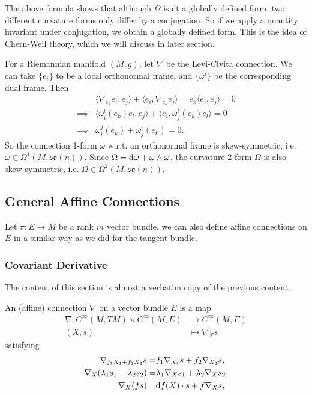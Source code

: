 The above formula shows that although $\Omega$ isn't a globally defined form, two different curvature forms 
only differ by a conjugation. So if we apply a quantity invariant under conjugation, we obtain a globally defined form. 
This is the idea of Chern-Weil theory, which we will discuss in later section.

For a Riemannian manifold $(M,g)$, let $\nabla$ be the Levi-Civita connection. We can take $\{e_i\}$ to be a local orthonormal frame, 
and $\{\omega^i\}$ be the corresponding dual frame. Then
\begin{align*}
    &\langle \nabla_{e_k} e_i, e_j \rangle + \langle e_i, \nabla_{e_k} e_j \rangle = e_k\langle e_i, e_j \rangle = 0 \\
    \implies &\langle \omega^l_i(e_k)e_l, e_j \rangle + \langle e_i, \omega^l_j(e_k)e_l \rangle = 0 \\
    \implies &\omega^j_i(e_k) + \omega^i_j(e_k) = 0.
\end{align*}
So the connection 1-form $\omega$ w.r.t. an orthonormal frame is skew-symmetric, i.e. $\omega \in \Omega^1(M,\mathfrak{so}(n))$. 
Since $\Omega={\rm d}\omega+\omega\wedge\omega$, the curvature 2-form $\Omega$ is also skew-symmetric, 
i.e. $\Omega \in \Omega^2(M,\mathfrak{so}(n))$.


\subsection{General Affine Connections}
Let $\pi:E\to M$ be a rank $m$ vector bundle, we can also define affine connections on $E$ in a similar way as we did for the tangent bundle. 
\subsubsection{Covariant Derivative}
The content of this section is almost a verbatim copy of the previous content. 
\begin{definition}\label{def:con-on-E}
    An (affine) connection $\nabla$ on a vector bundle $E$ is a map
    \begin{align*}
        \nabla: C^\infty(M,TM) \times C^\infty(M,E) &\to C^\infty(M,E) \\
        (X,s) &\mapsto \nabla_X s
    \end{align*}
    satisfying 
    \begin{align*}
        \nabla_{f_1X_1 + f_2X_2} s =& f_1 \nabla_{X_1} s + f_2 \nabla_{X_2} s, \\
        \nabla_X (\lambda_1 s_1 + \lambda_2 s_2) =& \lambda_1 \nabla_X s_1 + \lambda_2 \nabla_X s_2, \\
        \nabla_X (fs) =& {\rm d} f(X)\cdot s + f\nabla_X s,
    \end{align*}
\end{definition}

